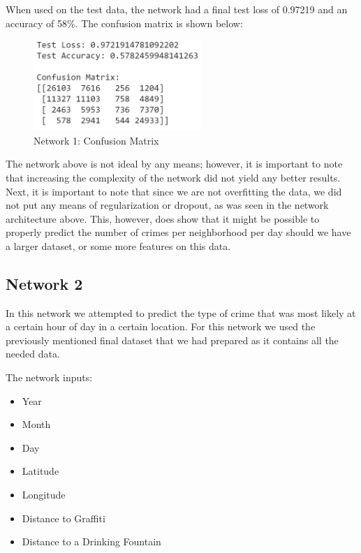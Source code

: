 \documentclass[conference]{IEEEtran}
\begin{document}
When used on the test data, the network had a final test loss of 0.97219 and an accuracy of 58\%. The confusion matrix is
shown below:

\begin{figure}[H]
  \centering
  \captionsetup{justification=centering}
  \centering
  \includegraphics[width=2.5in]{9.png}
  \caption{Network 1: Confusion Matrix}  
  \label{1}
\end{figure}

The network above is not ideal by any means; however, it is important to note that increasing the complexity
of the network did not yield any better results. Next, it is important to note that since we are not overfitting
the data, we did not put any means of regularization or dropout, as was seen in the network architecture above.
This, however, does show that it might be possible to properly predict the number of crimes per neighborhood
per day should we have a larger dataset, or some more features on this data.


\subsection{Network 2 \cite{Network_2}}

In this network we attempted to predict the type of crime that was most likely at a certain hour of day
in a certain location. For this network we used the previously mentioned final dataset that we had prepared \cite{finalcrime}
as it contains all the needed data. 

The network inputs:

\begin{itemize}
  \item Year
  \item Month
  \item Day
  \item Latitude
  \item Longitude
  \item Distance to Graffiti
  \item Distance to a Drinking Fountain
\end{itemize}
\end{document}
